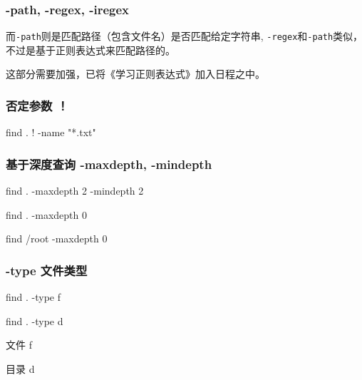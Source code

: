 \subsubsection{ -path, -regex, -iregex}


而\lstinline$-path$则是匹配路径（包含文件名）是否匹配给定字符串, \lstinline$-regex$和\lstinline$-path$类似，不过是基于正则表达式来匹配路径的。

这部分需要加强，已将《学习正则表达式》加入日程之中。


\subsubsection{否定参数 ！}

\begin{Bash}

find . ! -name "*.txt"

\end{Bash}


\subsubsection{基于深度查询 -maxdepth, -mindepth}

\begin{Bash}[查找第二层目录的所有文件]

find . -maxdepth 2 -mindepth 2

\end{Bash}

\begin{Bash}

find . -maxdepth 0

find /root -maxdepth 0

\end{Bash}

\subsubsection{-type 文件类型}

\begin{Bash}

find . -type f 

find . -type d

\end{Bash}



文件		f

目录		d

